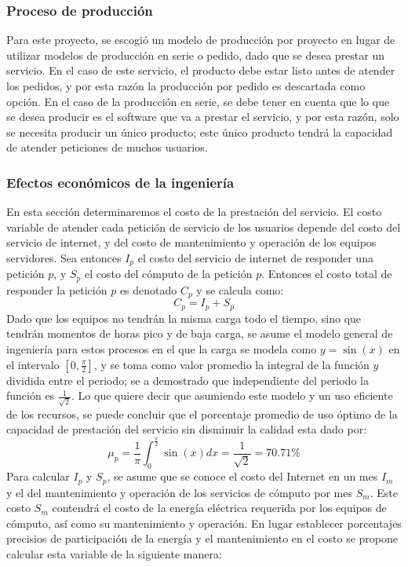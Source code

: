 \documentclass[a4paper, 12pt, oneside]{article}
\begin{document}
	\subsubsection{Proceso de producción}
	Para este proyecto, se escogió un modelo de producción por proyecto en lugar de utilizar modelos de producción en serie o pedido, dado que se desea prestar un servicio. En el caso de este servicio, el producto debe estar listo antes de atender los pedidos, y por esta razón la producción por pedido es descartada como opción. En el caso de la producción en serie, se debe tener en cuenta que lo que se desea producir es el software que va a prestar el servicio, y por esta razón, solo se necesita producir un único producto; este único producto tendrá la capacidad de atender peticiones de muchos usuarios.

	\subsubsection{Efectos económicos de la ingeniería}
	En esta sección determinaremos el costo de la prestación del servicio. El costo variable de atender cada petición de servicio de los usuarios depende del costo del servicio de internet, y del costo de mantenimiento y operación de los equipos servidores.\newline
	Sea entonces $I_p$ el costo del servicio de internet de responder una petición $p$, y $S_p$ el costo del cómputo de la petición $p$. Entonces el costo total de responder la petición $p$ es denotado $C_p$ y se calcula como:
	\begin{equation}
		C_p = I_p + S_p
		\label{eq:opCost}
	\end{equation}
	Dado que los equipos no tendrán la misma carga todo el tiempo, sino que tendrán momentos de horas pico y de baja carga, se asume el modelo general de ingeniería para estos procesos en el que la carga se modela como $y=\sin(x)$ en el intervalo $[0,\frac{\pi}{2}]$, y se toma como valor promedio la integral de la función $y$ dividida entre el periodo; se a demostrado que independiente del periodo la función es $\frac{1}{\sqrt{2}}$. Lo que quiere decir que asumiendo este modelo y un uso eficiente de los recursos, se puede concluir que el porcentaje promedio de uso óptimo de la capacidad de prestación del servicio sin disminuir la calidad esta dado por:
	\[ \mu_p=\frac{1}{\pi}\int_0^{\frac{\pi}{2}}{\sin(x)dx} = \frac{1}{\sqrt{2}} = 70.71\% \]
	Para calcular $I_p$ y $S_p$, se asume que se conoce el costo del Internet en un mes $I_m$ y el del mantenimiento y operación de los servicios de cómputo por mes $S_m$. Este costo $S_m$ contendrá el costo de la energía eléctrica requerida por los equipos de cómputo, así como su mantenimiento y operación. En lugar establecer porcentajes precisios de participación de la energía y el mantenimiento en el costo se propone calcular esta variable de la siguiente manera:
\end{document}
